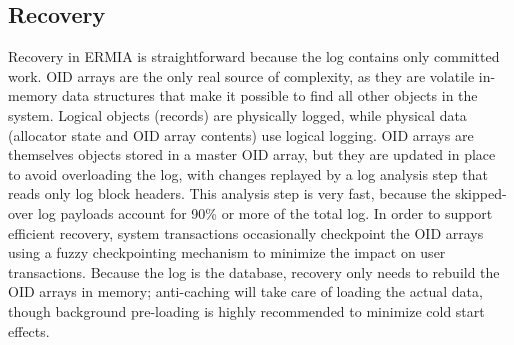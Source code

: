 \subsection{Recovery}

Recovery in ERMIA is straightforward because the log contains only committed work. OID arrays are the only real source of complexity, as they are volatile in-memory data structures that make it possible to find all other objects in the system. Logical objects (records) are physically logged, while physical data (allocator state and OID array contents) use logical logging. OID arrays are themselves objects stored in a master OID array, but they are updated in place to avoid overloading the log, with changes replayed by a log analysis step that reads only log block headers. This analysis step is very fast, because the skipped-over log payloads account for 90\% or more of the total log. In order to support efficient recovery, system transactions occasionally checkpoint the OID arrays using a fuzzy checkpointing mechanism to minimize the impact on user transactions. Because the log is the database, recovery only needs to rebuild the OID arrays in memory; anti-caching will take care of loading the actual data, though background pre-loading is highly recommended to minimize cold start effects.

%
